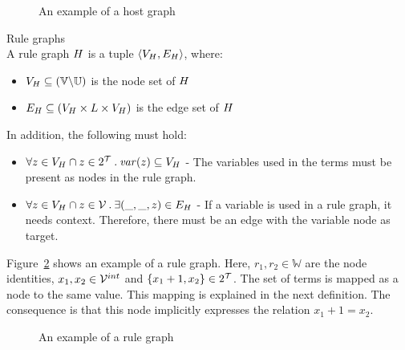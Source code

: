 \begin{figure}[ht]
  \begin{center}
    
  \end{center}
  \caption{An example of a host graph}
  \label{fig:hostgraph_example}
\end{figure}

\vspace{5px}
\begin{definition} Rule graphs \\
A rule graph $H$ is a tuple $\langle V_{H}, E_{H} \rangle$, where:
\begin{itemize}
  \item $V_{H} \subseteq (\mathbb{V} \backslash \mathbb{U})$ is the node set of $H$
  \item $E_{H} \subseteq (V_{H} \times L \times V_{H})$ is the edge set of $H$
\end{itemize}
In addition, the following must hold:
\begin{itemize}
\item $\forall z \in V_{H} \cap z \in 2^{\mathcal{T}}\: .\:\mathit{var}(z) \subseteq V_{H}$ - The variables used in the terms must be present as nodes in the rule graph.
\item $\forall z \in V_{H} \cap z \in \mathcal{V}\: .\: \exists (\_, \_, z) \in E_{H}$ - If a variable is used in a rule graph, it needs context. Therefore, there must be an edge with the variable node as target.
\end{itemize}
\end{definition}
\vspace{5px}

Figure~\ref{fig:rulegraph_example} shows an example of a rule graph. Here, $r_1, r_2 \in \mathbb{W}$ are the node identities, $x_1,x_2 \in \mathcal{V}^{int}$ and $\{x_1+1, x_2\} \in 2^{\mathcal{T}}$. The set of terms is mapped as a node to the same value. This mapping is explained in the next definition. The consequence is that this node implicitly expresses the relation $x_1+1 = x_2$.

\begin{figure}[ht]
  \begin{center}
    
  \end{center}
  \caption{An example of a rule graph}
  \label{fig:rulegraph_example}
\end{figure}

